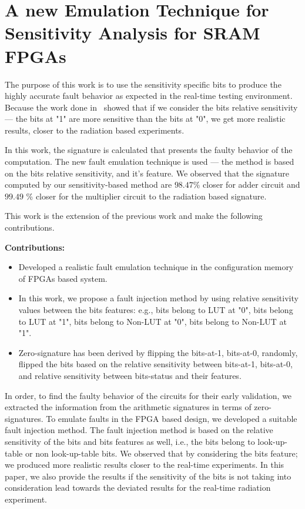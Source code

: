 

\section{A new Emulation Technique for Sensitivity Analysis
for SRAM FPGAs}
\label{intro}


The purpose of this work is  to  use the sensitivity specific bits to produce the highly accurate fault behavior as expected in the real-time testing environment. Because the work done in~\citep{souari2016towards} showed that if we consider the bits relative sensitivity --- the bits at "1" are more sensitive than the bits at "0", we get more realistic results, closer to the radiation based experiments. 

In this work, the signature is calculated that presents the faulty behavior of the computation. The new fault emulation technique is used --- the method is based on the bits relative sensitivity, and it's feature.  We observed that the signature computed by our sensitivity-based method are $98.47$\% closer for adder circuit and $99.49$ \% closer for the multiplier circuit to the radiation based signature.

This work is the extension of the previous work and make the following contributions. 


\textbf{Contributions:} \\

\begin{itemize}



\item{Developed a realistic fault emulation technique in the configuration memory
of FPGAs based system}.

\item{In this work, we propose a fault injection method by using relative sensitivity values between the bits features: e.g., bits belong to LUT at "0", bits belong to LUT at "1", bits belong to Non-LUT at "0", bits belong to Non-LUT at "1"}.

\item{Zero-signature has been derived by flipping the bits-at-1, bits-at-0, randomly, flipped the bits based on the relative sensitivity between bits-at-1, bits-at-0, and relative sensitivity between bits-status and their features}.
\end{itemize}


In order, to find the faulty behavior of the circuits for their early validation, we extracted the information from the arithmetic signatures in terms of zero-signatures. To emulate faults in the FPGA based design, we  developed a suitable fault injection method. The fault injection method is based on the relative sensitivity of the bits and bits features as well, i.e., the bits belong to look-up-table or non look-up-table bits. We observed that by considering the bits feature; we produced more realistic results closer to the real-time experiments. In this paper, we also provide the results if the sensitivity of the bits is not taking into consideration lead towards the deviated results for the real-time radiation experiment.




